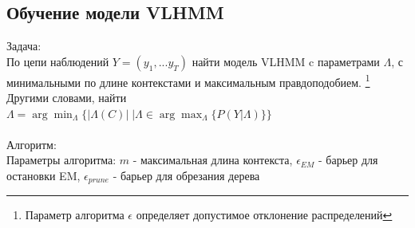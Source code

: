 \documentclass{matmex-diploma-custom}
\begin{document}
\subsection{Обучение модели VLHMM}
{\large Задача:} 
\\
По цепи наблюдений $ Y = (y_{1}, ... y_{T}) $ найти модель VLHMM c параметрами $ \Lambda$, с минимальными по длине контекстами и максимальным правдоподобием. 
\footnote{Параметр алгоритма $ \epsilon $ определяет допустимое отклонение распределений}
\\
Другими словами, найти
\\
$\Lambda = \arg\!\min_{\Lambda}{\{|\Lambda(C)|\;|\Lambda \in \arg\!\max_{\Lambda}{\{P(Y|\Lambda)\}}\}}$
\\\\
{\large Алгоритм:}
\\
Параметры алгоритма: 
$ m $ - максимальная длина контекста, 
$ \epsilon_{EM} $ - барьер для остановки EM,
$ \epsilon_{prune} $ - барьер для обрезания дерева
\\
\end{document}
